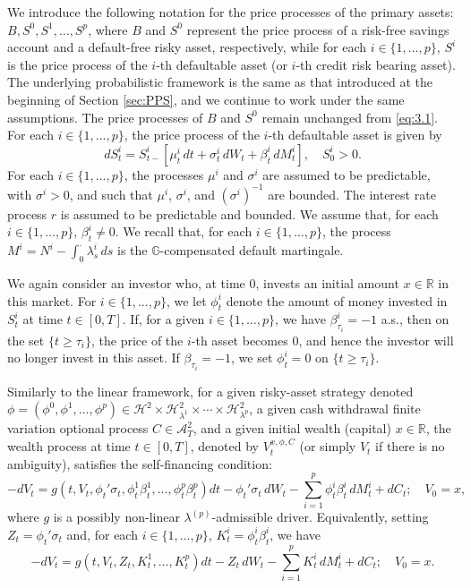 \documentclass[11pt,a4paper]{article}
\numberwithin{equation}{section}
\theoremstyle{newPlain}
\theoremstyle{newDefinition}
\theoremstyle{newRemark}
\begin{document}
We introduce the following notation for the price processes of the primary assets: $B, S^0, S^1, \ldots, S^p$, where $B$ and $S^0$ represent the price process of a risk-free savings account and a default-free risky asset, respectively, while for each $i \in \{1, \ldots, p\}$, $S^i$ is the price process of the $i$-th defaultable asset (or $i$-th credit risk bearing asset).  The underlying probabilistic framework is the same as that introduced at the beginning of Section \ref{sec:PPS}, and we continue to work under the same assumptions. The price processes of $B$ and $S^0$ remain unchanged from \eqref{eq:3.1}. For each $i \in \{1, \ldots, p\}$, the price process of the $i$-th defaultable asset is given by
\begin{equation}\label{eq:3_SPriceProcess1}
    dS_t^i = S_{t-}^i\left[\mu_t^i \, dt + \sigma_t^i \, dW_t + \beta_t^i \, dM_t^i\right], \quad S_0^i > 0.
\end{equation}
For each $i \in \{1, \ldots, p\}$, the processes $\mu^i$ and $\sigma^i$ are assumed to be predictable, with $\sigma^i > 0$, and such that $\mu^i$, $\sigma^i$, and $(\sigma^i)^{-1}$ are bounded. The interest rate process $r$ is assumed to be predictable and bounded. We assume that, for each $i \in \{1, \ldots, p\}$, $\beta_t^i\neq 0$.  We recall that, for each $i \in \{1, \ldots, p\}$, the process $M^i = N^i - \int_0^\cdot \lambda_s^i \, ds$ is the $\mathbb{G}$-compensated default martingale.

We again consider an investor who, at time $0$, invests an initial amount $x \in \mathbb{R}$ in this market. For $i \in \{1, \ldots, p\}$, we let $\phi_t^i$ denote the amount of money invested in $S_t^i$ at time $t \in [0, T]$. If, for a given $i \in \{1, \ldots, p\}$, we have $\beta_{\tau_i}^i = -1$ a.s., then on the set $\{t \ge \tau_i\}$, the price of the $i$-th asset becomes $0$, and hence the investor will no longer invest in this asset. If $\beta_{\tau_i}=-1$, we set $\phi_t^i = 0$ on $\{t \ge \tau_i\}$.

Similarly to the linear framework, for a given risky-asset strategy denoted $\phi = (\phi^0,\phi^1,\ldots,\phi^p) \in \mathcal{H}^2 \times \mathcal{H}_{\lambda^1}^2 \times \cdots \times \mathcal{H}_{\lambda^p}^2$, a given cash withdrawal finite variation optional process $C \in \mathcal{A}_T^2$, and a given initial wealth (capital) $x \in \mathbb{R}$, the wealth process at time $t \in [0,T]$, denoted by $V_t^{x,\phi,C}$ (or simply $V_t$ if there is no ambiguity), satisfies the self-financing condition:
\begin{equation}\label{eq:3_SelfFinancingnon-linear1}
   -dV_t = g(t,V_t, \phi_t'\sigma_t, \phi_t^1\beta_t^1,\ldots,\phi_t^p\beta_t^p)dt - \phi_t'\sigma_t\,dW_t - \sum_{i=1}^p \phi_t^i \beta_t^i\,dM_t^i + dC_t; \quad V_0 = x,
\end{equation}
where $g$ is a possibly non-linear $\lambda^{(p)}$-admissible driver. Equivalently, setting $Z_t = \phi_t'\sigma_t$ and, for each $i \in \{1, \ldots, p\}$, $K_t^i = \phi_t^i\beta_t^i$, we have
\begin{equation}\label{eq:3_SelfFinancingnon-linear2}
   -dV_t = g(t,V_t, Z_t, K_t^1,\ldots,K_t^p)dt - Z_t\,dW_t - \sum_{i=1}^p K_t^i\,dM_t^i + dC_t; \quad V_0 = x.
\end{equation}
\end{document}
